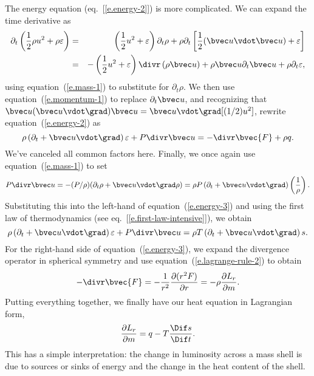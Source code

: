 The energy equation (eq.~[\ref{e.energy-2}]) is more complicated. We can expand the time derivative as
\begin{eqnarray*}
	\partial_{t} \left( \frac{1}{2}\rho u^{2} + \rho \varepsilon \right)
	&=& \left(\frac{1}{2}u^{2} + \varepsilon\right)\partial_{t}\rho + \rho\partial_{t}\left[\frac{1}{2}(\vu\vdot\vu) + \varepsilon\right]\\
	&=& -\left(\frac{1}{2}u^{2} + \varepsilon\right)\divr\left(\rho\vu\right) + \rho \vu\partial_{t}\vu + \rho\partial_{t}\varepsilon,
\end{eqnarray*}
using equation~(\ref{e.mass-1}) to substitute for $\partial_{t}\rho$.  We then use equation~(\ref{e.momentum-1}) to replace $\partial_{t}\vu$, and recognizing that $\vu(\vu\vdot\grad)\vu = \vu\vdot\grad[(1/2)u^{2}]$, rewrite equation~(\ref{e.energy-2}) as
\begin{equation}\label{e.energy-3}
	\rho\left(\partial_{t} + \vu\vdot\grad\right) \varepsilon + P\divr\vu = -\divr\bvec{F} + \rho q.
\end{equation}
We've canceled all common factors here.  Finally, we once again use equation~(\ref{e.mass-1}) to set
\[
	P\divr\vu = -(P/\rho)(\partial_{t}\rho + \vu\vdot\grad \rho)
	= \rho P\left(\partial_{t} + \vu\vdot\grad\right)\left(\frac{1}{\rho}\right).
\]
Substituting this into the left-hand of equation~(\ref{e.energy-3})  and using the first law of thermodynamics (see eq.~[\ref{e.first-law-intensive}]), we obtain
\begin{equation}
\rho\left(\partial_{t} + \vu\vdot\grad\right) \varepsilon + P\divr\vu = \rho T \left(\partial_{t} + \vu\vdot\grad\right) s.
\end{equation}
For the right-hand side of equation~(\ref{e.energy-3}), we expand the divergence operator in spherical symmetry and use equation~(\ref{e.lagrange-rule-2}) to obtain
\[
	-\divr\bvec{F} = -\frac{1}{r^{2}}\frac{\partial(r^{2} F)}{\partial r} = -\rho\frac{\partial L_{r}}{\partial m}.
\]
Putting everything together, we finally have our heat equation in Lagrangian form,
\begin{equation}\label{e.lagrange-heat}
	\frac{\partial L_{r}}{\partial m} = q - T\frac{\Dif s}{\Dif t}.
\end{equation}
This has a simple interpretation: the change in luminosity across a mass shell is due to sources or sinks of energy and the change in the heat content of the shell.

